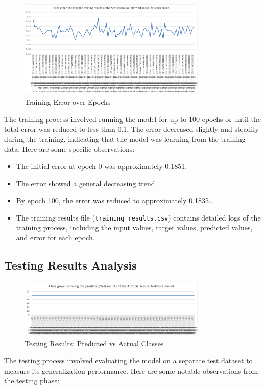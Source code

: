 \documentclass{article}
\begin{document}
\begin{figure}[h!]
\centering
\includegraphics[width=0.8\textwidth]{ANN_training_results.png}  
\caption{Training Error over Epochs}
\end{figure}

The training process involved running the model for up to 100 epochs or until the total error was reduced to less than 0.1. The error decreased slightly and steadily during the training, indicating that the model was learning from the training data. Here are some specific observations:

\begin{itemize}
    \item The initial error at epoch 0 was approximately 0.1851.
    \item The error showed a general decreasing trend.
    \item By epoch 100, the error was reduced to approximately 0.1835..
    \item The training results file (\texttt{training\_results.csv}) contains detailed logs of the training process, including the input values, target values, predicted values, and error for each epoch.
\end{itemize}

\subsection{Testing Results Analysis}
\begin{figure}[h!]
\centering
\includegraphics[width=0.8\textwidth]{ANN_testing_results.png}  
\caption{Testing Results: Predicted vs Actual Classes}
\end{figure}
The testing process involved evaluating the model on a separate test dataset to measure its generalization performance. Here are some notable observations from the testing phase:
\end{document}
